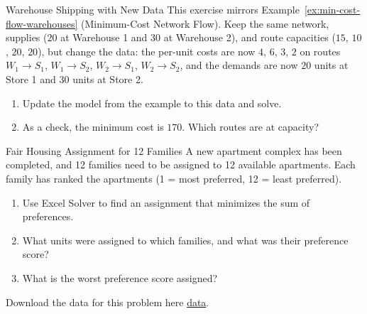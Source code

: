 \begin{ex}{Warehouse Shipping with New Data}{}
\label{ex:network-flow-warmup}
 This exercise mirrors Example~\ref{ex:min-cost-flow-warehouses} (Minimum-Cost Network Flow).  Keep the same network, supplies ($20$ at Warehouse 1 and $30$ at Warehouse 2), and route capacities ($15$, $10$, $20$, $20$), but change the data: the per-unit costs are now $4$, $6$, $3$, $2$ on routes $W_1 \to S_1$, $W_1 \to S_2$, $W_2 \to S_1$, $W_2 \to S_2$, and the demands are now $20$ units at Store 1 and $30$ units at Store 2.
\begin{enumerate}
\item Update the model from the example to this data and solve.
\item As a check, the minimum cost is $170$.  Which routes are at capacity?
\end{enumerate}
\end{ex}


\begin{ex}{Fair Housing Assignment for 12 Families}{}
\label{ex:fair-housing-assignment}
 A new apartment complex has been completed, and 12 families need to be assigned to 12 available apartments. Each family has ranked the apartments (1 = most preferred, 12 = least preferred). 
\begin{enumerate}
\item Use Excel Solver to find an assignment that minimizes the sum of preferences.

\item What units were assigned to which families, and what was their preference score?

\item What is the worst preference score assigned?
\end{enumerate}
Download the data for this problem here \href{https://github.com/open-optimization/open-optimization-or-book/blob/master/Intro-Math-Programming/baseText/optimization/optimization-examples/Family-Apartment_Preferences__12_.csv}{data}.
\exrefs{\S\ref{sec:assignment-problem}}
\end{ex}


